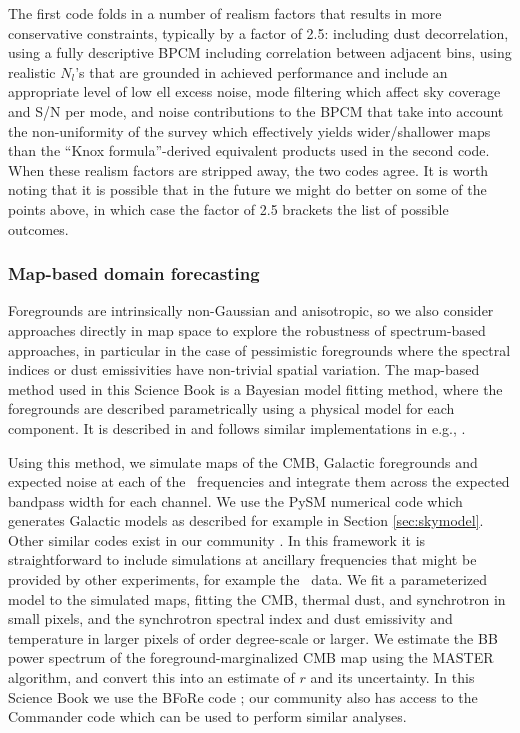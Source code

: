 The first code folds in a number of realism factors that results in more conservative
constraints, typically by a factor of 2.5: including dust decorrelation, using a 
fully descriptive BPCM including correlation between adjacent bins, 
using realistic $N_l$'s that are grounded in achieved performance and include
an appropriate level of low ell excess noise, mode filtering which affect sky coverage
and S/N per mode, and noise contributions to the BPCM that take into account the 
non-uniformity of the survey which effectively yields wider/shallower maps than the 
``Knox formula''-derived \cite{Knox:1995dq} equivalent products used in the second code. When these realism factors
are stripped away, the two codes agree. It is worth noting that it is possible that in the future we might do better on 
some of the points above, in which case the factor of 2.5 brackets the list of 
possible outcomes.  

\subsubsection{Map-based domain forecasting}

Foregrounds are intrinsically non-Gaussian and anisotropic, so we also consider approaches directly in map space to explore the robustness of spectrum-based approaches, in particular in the case of pessimistic foregrounds where the spectral indices or dust emissivities have non-trivial spatial variation. The map-based method used in this Science Book is a Bayesian model fitting method, where the foregrounds are described parametrically using a physical model for each component. It is described in \cite{Alonso:2016xft} and follows similar implementations in e.g., \cite{Eriksen:2005dr}.

Using this method, we simulate maps of the CMB, Galactic foregrounds and expected noise at each of the \cmbexp\ frequencies and integrate them across the expected bandpass width for each channel. We use the PySM numerical code \cite{Thorne:2016ifb} which generates Galactic models as described for example in Section \ref{sec:skymodel}. Other similar codes exist in our community \cite{Delabrouille:2012ye}. In this framework it is straightforward to include simulations at ancillary frequencies that might be provided by other experiments, for example the \planck\ data. We fit a parameterized model to the simulated maps, fitting the CMB, thermal dust, and synchrotron in small pixels, and the synchrotron spectral index and dust emissivity and temperature in larger pixels of order degree-scale or larger. We estimate the BB power spectrum of the foreground-marginalized CMB map using the MASTER \cite{Hivon:2001jp} algorithm, and convert this into an estimate of $r$ and its uncertainty. In this Science Book we use the BFoRe code \cite{Alonso:2016xft}; our community also has access to the Commander code which can be used to perform similar analyses.

